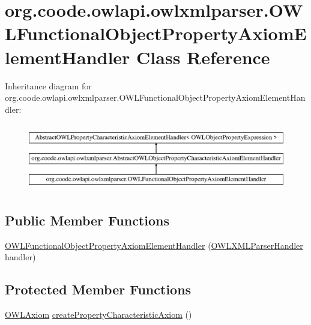 \hypertarget{classorg_1_1coode_1_1owlapi_1_1owlxmlparser_1_1_o_w_l_functional_object_property_axiom_element_handler}{\section{org.\-coode.\-owlapi.\-owlxmlparser.\-O\-W\-L\-Functional\-Object\-Property\-Axiom\-Element\-Handler Class Reference}
\label{classorg_1_1coode_1_1owlapi_1_1owlxmlparser_1_1_o_w_l_functional_object_property_axiom_element_handler}
}
Inheritance diagram for org.\-coode.\-owlapi.\-owlxmlparser.\-O\-W\-L\-Functional\-Object\-Property\-Axiom\-Element\-Handler\-:\begin{figure}[H]
\begin{center}
\leavevmode
\includegraphics[height=2.984014cm]{classorg_1_1coode_1_1owlapi_1_1owlxmlparser_1_1_o_w_l_functional_object_property_axiom_element_handler}
\end{center}
\end{figure}
\subsection*{Public Member Functions}
\begin{DoxyCompactItemize}
\item 
\hyperlink{classorg_1_1coode_1_1owlapi_1_1owlxmlparser_1_1_o_w_l_functional_object_property_axiom_element_handler_a5ebba69bf0a16f558b739be3eede8f3d}{O\-W\-L\-Functional\-Object\-Property\-Axiom\-Element\-Handler} (\hyperlink{classorg_1_1coode_1_1owlapi_1_1owlxmlparser_1_1_o_w_l_x_m_l_parser_handler}{O\-W\-L\-X\-M\-L\-Parser\-Handler} handler)
\end{DoxyCompactItemize}
\subsection*{Protected Member Functions}
\begin{DoxyCompactItemize}
\item 
\hyperlink{interfaceorg_1_1semanticweb_1_1owlapi_1_1model_1_1_o_w_l_axiom}{O\-W\-L\-Axiom} \hyperlink{classorg_1_1coode_1_1owlapi_1_1owlxmlparser_1_1_o_w_l_functional_object_property_axiom_element_handler_a8dd25340f0ebef694295010b1f3ebd0b}{create\-Property\-Characteristic\-Axiom} ()
\end{DoxyCompactItemize}


